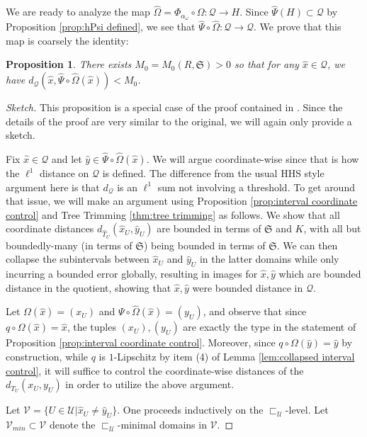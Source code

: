 \documentclass{amsart}
\newtheorem{proposition}[theorem]{Proposition}
\theoremstyle{definition}
\theoremstyle{remark}
\theoremstyle{definition}
\newcommand{\calQ}{\mathcal{Q}}
\newcommand{\calU}{\mathcal{U}}
\newcommand{\calV}{\mathcal{V}}
\newcommand{\hT}{\widehat{T}}
\newcommand{\hx}{\hat{x}}
\newcommand{\hy}{\hat{y}}
\newcommand{\hO}{\widehat{\Omega}}
\newcommand{\hPsi}{\widehat{\Psi}}
\newcommand{\nest}{\sqsubset}
\begin{document}
We are ready to analyze the map $\hO = \Phi_{\alpha_{\omega}} \circ \Omega:\calQ \to H$.    Since $\hPsi(H) \subset \calQ$ by Proposition \ref{prop:hPsi defined}, we see that $\hPsi \circ \hO:\calQ \to \calQ$.  We prove that this map is coarsely the identity:

\begin{proposition}\label{prop:coarse surjectivity}
There exists $M_0 = M_0(R, \mathfrak S)>0$ so that for any $\hx \in \calQ$, we have $d_{\calQ}(\hx, \hPsi \circ \hO(\hx)) < M_0$. 
\end{proposition}

\begin{proof}[Sketch]
This proposition is a special case of the proof contained in \cite[Subsection 11.2]{Dur_infcube}.  Since the details of the proof are very similar to the original, we will again only provide a sketch.

Fix $\hx \in \calQ$ and let $\hy \in \hPsi \circ \hO(\hx)$. We will argue coordinate-wise since that is how the $\ell^1$ distance on $\calQ$ is defined.  The difference from the usual HHS style argument here is that $d_{\calQ}$ is an $\ell^1$ sum not involving a threshold.  To get around that issue, we will make an argument using Proposition \ref{prop:interval coordinate control} and Tree Trimming \ref{thm:tree trimming} as follows.  We show that all coordinate distances $d_{\hT_U}(\hx_U, \hy_U)$ are bounded in terms of $\mathfrak S$ and $K$, with all but boundedly-many (in terms of $\mathfrak S$) being bounded in terms of $\mathfrak S$.  We can then collapse the subintervals between $\hx_U$ and $\hy_U$ in the latter domains while only incurring a bounded error globally, resulting in images for $\hx,\hy$ which are bounded distance in the quotient, showing that $\hx,\hy$ were bounded distance in $\calQ$.

Let $\Omega(\hx) = (x_U)$ and $\Psi \circ \hO(\hx) = (y_U)$, and observe that since $q\circ \Omega(\hx) = \hx$, the tuples $(x_U), (y_U)$ are exactly the type in the statement of Proposition \ref{prop:interval coordinate control}.  Moreover, since $q \circ \Omega(\hy) = \hy$ by construction, while $q$ is $1$-Lipschitz by item (4) of Lemma \ref{lem:collapsed interval control}, it will suffice to control the coordinate-wise distances of the $d_{T_U}(x_U,y_U)$ in order to utilize the above argument.

Let $\calV = \{U \in \calU| \hx_U \neq \hy_U\}$.  One proceeds inductively on the $\nest_{\calU}$-level.  Let $\calV_{min} \subset \calV$ denote the $\nest_{\calU}$-minimal domains in $\calV$.


\end{proof}
\end{document}
